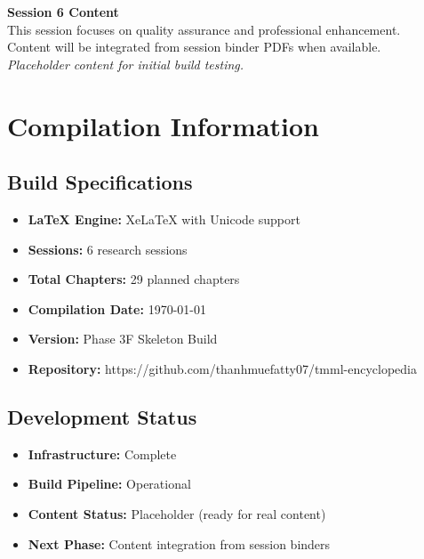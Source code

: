 \documentclass[12pt,oneside]{book}
\begin{document}
\vspace{2cm}
\begin{center}
{\Large \textbf{Session 6 Content}}\\[12pt]
{\normalsize This session focuses on quality assurance and professional enhancement.}\\
{\normalsize Content will be integrated from session binder PDFs when available.}\\[12pt]
{\itshape Placeholder content for initial build testing.}
\end{center}
\newpage

\appendix
\chapter{Compilation Information}

\section{Build Specifications}
\begin{itemize}
\item \textbf{LaTeX Engine:} XeLaTeX with Unicode support
\item \textbf{Sessions:} 6 research sessions
\item \textbf{Total Chapters:} 29 planned chapters
\item \textbf{Compilation Date:} \today
\item \textbf{Version:} Phase 3F Skeleton Build
\item \textbf{Repository:} https://github.com/thanhmuefatty07/tmml-encyclopedia
\end{itemize}

\section{Development Status}
\begin{itemize}
\item \textbf{Infrastructure:} Complete
\item \textbf{Build Pipeline:} Operational
\item \textbf{Content Status:} Placeholder (ready for real content)
\item \textbf{Next Phase:} Content integration from session binders
\end{itemize}
\end{document}
